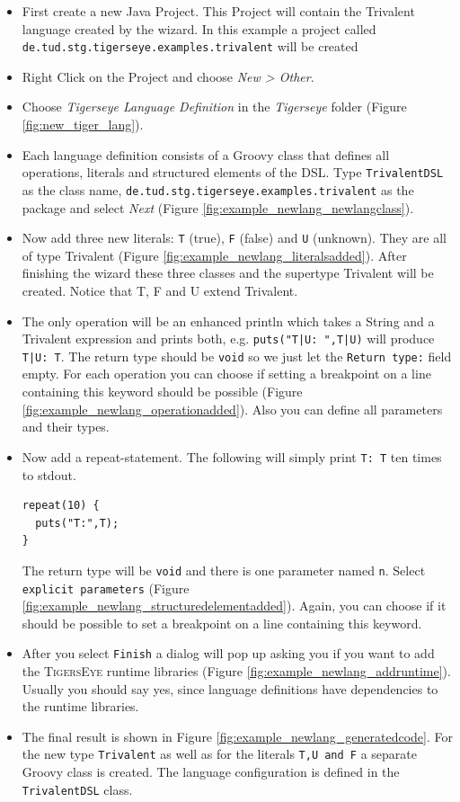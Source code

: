 \documentclass[article,colorback,accentcolor=tud4c]{tudreport}
\newcommand\tiger{%
  \textsc{TigersEye}
}
\begin{document}
	\begin{itemize}
	 \item First create a new Java Project. This Project will contain the Trivalent language created by the wizard. In this example a project called \texttt{de.tud.stg.tigerseye.examples.trivalent} will be created
	 \item Right Click on the Project and choose \emph{New > Other}.
	 \item Choose \emph{Tigerseye Language Definition} in the \emph{Tigerseye} folder (Figure \ref{fig:new_tiger_lang}).
	 \item Each language definition consists of a Groovy class that defines all operations, literals and structured elements of the DSL. Type \texttt{TrivalentDSL} as the class name, \texttt{de.tud.stg.tigerseye.examples.trivalent} as the package and select \emph{Next} (Figure \ref{fig:example_newlang_newlangclass}).
	 \item Now add three new literals: \texttt{T} (true), \texttt{F} (false) and \texttt{U} (unknown). They are all of type Trivalent (Figure \ref{fig:example_newlang_literalsadded}). After finishing the wizard these three classes and the supertype Trivalent will be created. Notice that T, F and U extend Trivalent.
	\item The only operation will be an enhanced println which takes a String and a Trivalent expression and prints both, e.g. \texttt{puts("T|U: ",T|U)} will produce \texttt{T|U: T}. The return type should be \texttt{void} so we just let the \texttt{Return type:} field empty. For each operation you can choose if setting a breakpoint on a line containing this keyword should be possible (Figure \ref{fig:example_newlang_operationadded}). Also you can define all parameters and their types.
	\item Now add a repeat-statement. The following will simply print \texttt{T: T} ten times to stdout.
	  \begin{verbatim}	  
repeat(10) {
  puts("T:",T);
}
	  \end{verbatim}
	The return type will be \texttt{void} and there is one parameter named \texttt{n}. Select \texttt{explicit parameters} (Figure \ref{fig:example_newlang_structuredelementadded}).
	Again, you can choose if it should be possible to set a breakpoint on a line containing this keyword.
	\item After you select \texttt{Finish} a dialog will pop up asking you if you want to add the \tiger runtime libraries (Figure \ref{fig:example_newlang_addruntime}). Usually you should say yes, since language definitions have dependencies to the runtime libraries.
	\item The final result is shown in Figure \ref{fig:example_newlang_generatedcode}. For the new type \texttt{Trivalent} as well as for the literals \texttt{T,U and F} a separate Groovy class is created. The language configuration is defined in the \texttt{TrivalentDSL} class.
	\end{itemize}
\end{document}
